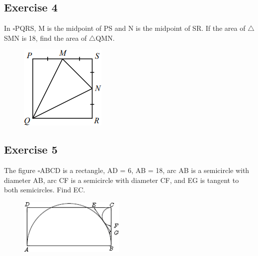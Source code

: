 \documentclass[12pt]{article}
\begin{document}
\vspace{0.5in}

\subsection*{Exercise 4}
In $\square$PQRS, M is the midpoint of PS and N is the midpoint of SR. If the area of $\triangle$SMN is 18, find the area of $\triangle$QMN.
\begin{figure}[h]
    \includegraphics[scale = 0.75]{image4.png}
\end{figure}

\vspace{0.5in} %

\subsection*{Exercise 5}
The figure $\square$ABCD is a rectangle, AD = 6, AB = 18, arc AB is a semicircle with diameter AB, arc
CF is a semicircle with diameter CF, and EG is tangent to both semicircles. Find EC.\\
\vspace*{-0.3in}
\begin{figure}[h]
    \includegraphics[]{image5.png}
\end{figure}

\vspace{0.5in} %
\vspace{3in}
\end{document}
